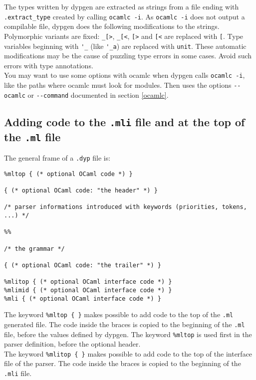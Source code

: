 \documentclass[12pt]{article}
\begin{document}
{The types written by dypgen are extracted as strings from a file ending with \verb|.extract_type| created by calling \verb|ocamlc -i|. As \verb|ocamlc -i| does not output a compilable file, dypgen does the following modifications to the strings. Polymorphic variants are fixed: \verb|_[>|, \verb|_[<|, \verb|[>| and \verb|[<| are replaced with \verb|[|. Type variables beginning with \verb|'_| (like \verb|'_a|) are replaced with \verb|unit|. These automatic modifications may be the cause of puzzling type errors in some cases. Avoid such errors with type annotations.\\

You may want to use some options with ocamlc when dypgen calls \verb|ocamlc -i|, like the paths where ocamlc must look for modules. Then uses the options \verb|--ocamlc| or \verb|--command| documented in section \ref{ocamlc}.

\subsection{Adding code to the \texttt{.mli} file and at the top of the \texttt{.ml} file}\label{mli}

The general frame of a \verb|.dyp| file is:
\begin{verbatim}
%mltop { (* optional OCaml code *) }

{ (* optional OCaml code: "the header" *) }

/* parser informations introduced with keywords (priorities, tokens, ...) */

%%

/* the grammar */

{ (* optional OCaml code: "the trailer" *) }

%mlitop { (* optional OCaml interface code *) }
%mlimid { (* optional OCaml interface code *) }
%mli { (* optional OCaml interface code *) }
\end{verbatim}

The keyword \verb|%mltop { }| makes possible to add code to the top of the \verb|.ml| generated file. The code inside the braces is copied to the beginning of the \texttt{.ml} file, before the values defined by dypgen. The keyword \verb|%mltop| is used first in the parser definition, before the optional header.\\

The keyword \verb|%mlitop { }| makes possible to add code to the top of the interface file of the parser. The code inside the braces is copied to the beginning of the \texttt{.mli} file.\\

}
\end{document}
